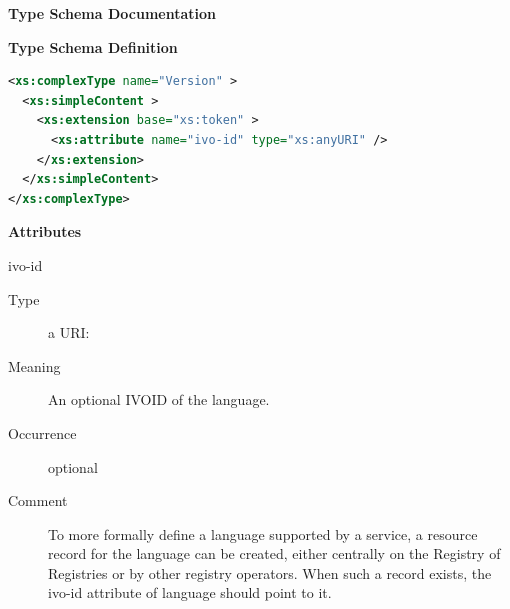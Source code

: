 \documentclass{ivoa}
\begin{document}
\begin{generated}
\begingroup
      	\renewcommand*\descriptionlabel[1]{%
      	\hbox to 5.5em{\emph{#1}\hfil}}\vspace{2ex}\noindent\textbf{ Type Schema Documentation}



\vspace{1ex}\noindent\textbf{ Type Schema Definition}

\begin{lstlisting}[language=XML,basicstyle=\footnotesize]
<xs:complexType name="Version" >
  <xs:simpleContent >
    <xs:extension base="xs:token" >
      <xs:attribute name="ivo-id" type="xs:anyURI" />
    </xs:extension>
  </xs:simpleContent>
</xs:complexType>
\end{lstlisting}

\vspace{0.5ex}\noindent\textbf{ Attributes}

\begingroup\small\begin{bigdescription}
\item[ivo-id]
\begin{description}
\item[Type] a URI: 
\item[Meaning] 
            An optional IVOID of the language.
            
\item[Occurrence] optional
\item[Comment] 
              To more formally define a language supported by a service,
              a resource record for the language can be created, either
              centrally on the Registry of Registries or by other registry operators.  
              When such a record exists, the ivo-id attribute of language
              should point to it.
            
\end{description}


\end{bigdescription}\endgroup

\endgroup
\end{generated}
\end{document}
